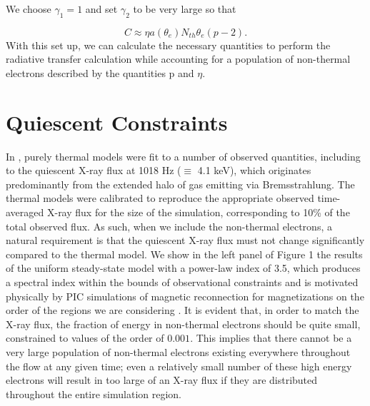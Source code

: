 We choose $\gamma_1=1$ and set $\gamma_2$ to be very large so that

\begin{equation}
	C \approx \eta a(\theta_e) N_{th}\theta_e (p-2).
\end{equation}
With this set up, we can calculate the necessary quantities to perform the radiative transfer calculation while accounting for a population of non-thermal electrons described by the quantities p and $\eta$. 

\section{Quiescent Constraints}

In \citet{chan2015a}, purely thermal models were fit
to a number of observed quantities, including to the quiescent X-ray flux at 1018 Hz ($\equiv$ 4.1 keV), which originates
predominantly from the extended halo of gas emitting via
Bremsstrahlung. The thermal models were calibrated to
reproduce the appropriate observed time-averaged X-ray
flux for the size of the simulation, corresponding to 10\%
of the total observed flux. As such, when we include the
non-thermal electrons, a natural requirement is that the
quiescent X-ray flux must not change significantly compared to the thermal model.
We show in the left panel of Figure 1 the results of the
uniform steady-state model with a power-law index of
3.5, which produces a spectral index within the bounds
of observational constraints \citep{barriere2014, porquet2008} and is motivated physically by PIC
simulations of magnetic reconnection for magnetizations
on the order of the regions we are considering \citep{sironi2014}. It is evident that, in order to match
the X-ray flux, the fraction of energy in non-thermal electrons should be quite small, constrained to values of the
order of $0.001$. This implies that there cannot be a very
large population of non-thermal electrons existing everywhere throughout the flow at any given time; even a relatively small number of these high energy electrons will
result in too large of an X-ray flux if they are distributed
throughout the entire simulation region.

